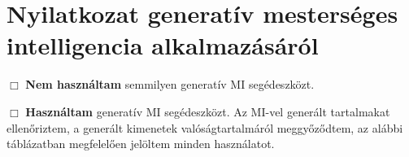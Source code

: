 \chapter*{Nyilatkozat generatív mesterséges intelligencia alkalmazásáról}

\noindent $\Box$ \textbf{Nem használtam} semmilyen generatív MI segédeszközt.

\noindent $\Box$ \textbf{Használtam} generatív MI segédeszközt. Az MI-vel generált tartalmakat ellenőriztem, a generált kimenetek valóságtartalmáról meggyőződtem, az alábbi táblázatban megfelelően jelöltem minden használatot.


